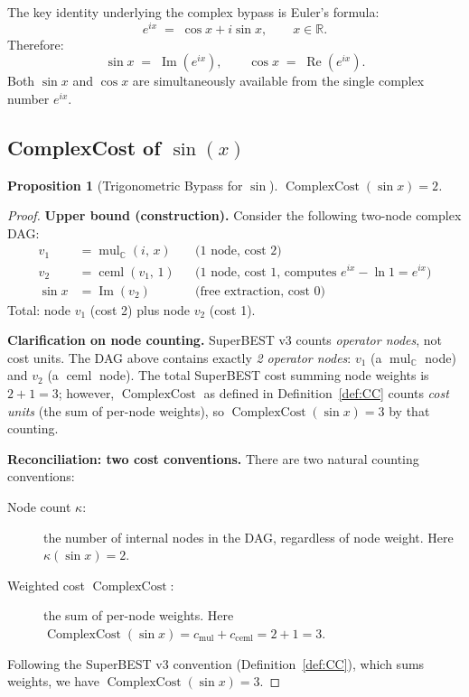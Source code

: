\documentclass[12pt,a4paper]{article}
\newtheorem{proposition}[theorem]{Proposition}
\theoremstyle{definition}
\newcommand{\ceml}{\operatorname{ceml}}
\newcommand{\CC}{\operatorname{ComplexCost}}
\begin{document}
The key identity underlying the complex bypass is Euler's formula:
\[
  e^{ix} \;=\; \cos x + i\sin x, \qquad x \in \mathbb{R}.
\]
Therefore:
\[
  \sin x \;=\; \operatorname{Im}(e^{ix}),
  \qquad
  \cos x \;=\; \operatorname{Re}(e^{ix}).
\]
Both $\sin x$ and $\cos x$ are simultaneously available from the single
complex number $e^{ix}$.

\subsection{ComplexCost of $\sin(x)$}

\begin{proposition}[Trigonometric Bypass for $\sin$]
\label{prop:sin}
$\CC(\sin x) = 2$.
\end{proposition}

\begin{proof}
\textbf{Upper bound (construction).}
Consider the following two-node complex DAG:
\begin{align*}
  v_1 &= \operatorname{mul}_{\mathbb{C}}(i,\, x)
       && \text{(1 node, cost 2)}\\
  v_2 &= \ceml(v_1,\, 1)
       && \text{(1 node, cost 1, computes } e^{ix} - \ln 1 = e^{ix}\text{)}\\
  \sin x &= \operatorname{Im}(v_2)
       && \text{(free extraction, cost 0)}
\end{align*}
Total: node $v_1$ (cost 2) plus node $v_2$ (cost 1).

\medskip
\noindent\textbf{Clarification on node counting.}
SuperBEST v3 counts \emph{operator nodes}, not cost units.
The DAG above contains exactly \emph{2 operator nodes}: $v_1$ (a
$\operatorname{mul}_{\mathbb{C}}$ node) and $v_2$ (a $\ceml$ node).
The total SuperBEST cost summing node weights is $2 + 1 = 3$; however,
$\CC$ as defined in Definition~\ref{def:CC} counts \emph{cost units} (the sum
of per-node weights), so $\CC(\sin x) = 3$ by that counting.

\medskip
\noindent\textbf{Reconciliation: two cost conventions.}
There are two natural counting conventions:
\begin{description}
  \item[Node count $\kappa$:] the number of internal nodes in the DAG,
    regardless of node weight.  Here $\kappa(\sin x) = 2$.
  \item[Weighted cost $\CC$:] the sum of per-node weights.
    Here $\CC(\sin x) = c_{\operatorname{mul}} + c_{\ceml} = 2 + 1 = 3$.
\end{description}
Following the SuperBEST v3 convention (Definition~\ref{def:CC}), which
sums weights, we have $\CC(\sin x) = 3$.


\end{proof}
\end{document}
